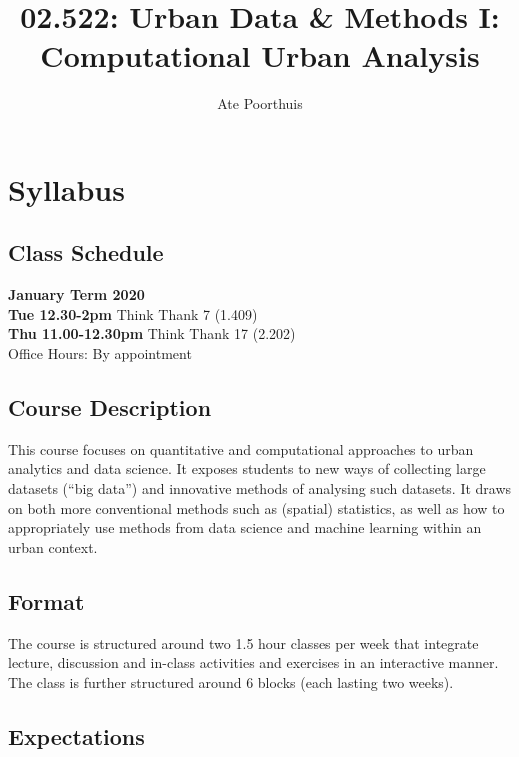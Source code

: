 \documentclass[]{book}
\title{02.522: Urban Data \& Methods I: Computational Urban Analysis}
\author{Ate Poorthuis}
\date{}
\begin{document}
\maketitle

{
\setcounter{tocdepth}{1}
\tableofcontents
}
\hypertarget{syllabus}{%
\chapter{Syllabus}\label{syllabus}}

\hypertarget{class-schedule}{%
\section{Class Schedule}\label{class-schedule}}

\textbf{January Term 2020}\\
\textbf{Tue 12.30-2pm} Think Thank 7 (1.409)\\
\textbf{Thu 11.00-12.30pm} Think Thank 17 (2.202)\\
Office Hours: By appointment

\hypertarget{course-description}{%
\section{Course Description}\label{course-description}}

This course focuses on quantitative and computational approaches to urban analytics and data science. It exposes students to new ways of collecting large datasets (``big data'') and innovative methods of analysing such datasets. It draws on both more conventional methods such as (spatial) statistics, as well as how to appropriately use methods from data science and machine learning within an urban context.

\hypertarget{format}{%
\section{Format}\label{format}}

The course is structured around two 1.5 hour classes per week that integrate lecture, discussion and in-class activities and exercises in an interactive manner. The class is further structured around 6 blocks (each lasting two weeks).

\hypertarget{expectations}{%
\section{Expectations}\label{expectations}}
\end{document}
